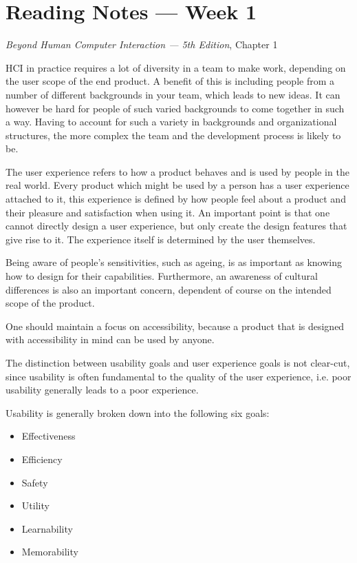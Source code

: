 \section{Reading Notes --- Week 1}

\textit{Beyond Human Computer Interaction --- 5th Edition}, Chapter 1

HCI in practice requires a lot of diversity in a team to make work, depending on the user scope of the end product.
A benefit of this is including people from a number of different backgrounds in your team, which leads to new ideas.
It can however be hard for people of such varied backgrounds to come together in such a way. Having to account for
such a variety in backgrounds and organizational structures, the more complex the team and the development process is
likely to be.

The user experience refers to how a product behaves and is used by people in the real world. Every product which might
be used by a person has a user experience attached to it, this experience is defined by how people feel about a product
and their pleasure and satisfaction when using it. An important point is that one cannot directly design a user 
experience, but only create the design features that give rise to it. The experience itself is determined by the user
themselves.

Being aware of people's sensitivities, such as ageing, is as important as knowing how to design for their
capabilities. Furthermore, an awareness of cultural differences is also an important concern, dependent of course on the
intended scope of the product.

One should maintain a focus on accessibility, because a product that is designed with accessibility in mind can be used
by anyone. 

The distinction between usability goals and user experience goals is not clear-cut, since usability is often fundamental
to the quality of the user experience, i.e. poor usability generally leads to a poor experience.

Usability is generally broken down into the following six goals:
\begin{itemize}
	\item Effectiveness
	\item Efficiency
	\item Safety
	\item Utility
	\item Learnability
	\item Memorability
\end{itemize}

